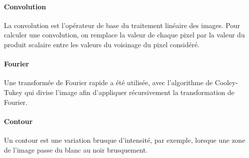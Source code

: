 	\paragraph{Convolution}
	\label{Convolution}

	La convolution est l'opérateur de base du traitement linéaire des images. Pour calculer une convolution, on remplace la valeur de chaque pixel par la valeur du produit scalaire entre les valeurs du voisinage du pixel considéré.

	\paragraph{Fourier}
	\label{Fourier}

	Une transformée de Fourier rapide a été utilisée, avec l'algorithme de Cooley-Tukey qui divise l'image afin d'appliquer récursivement la transformation de Fourier.

	\paragraph{Contour}
	
	Un contour est une variation brusque d'intensité, par exemple, lorsque une zone de l'image passe du blanc au noir brusquement.
